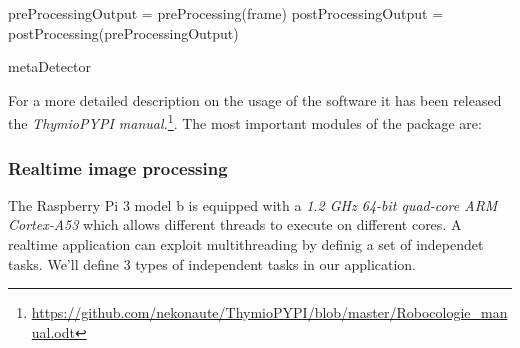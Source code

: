 \documentclass[a4paper]{report}
\begin{document}
\begin{algorithm}[H]
 preProcessingOutput = preProcessing(frame)\;
 postProcessingOutput = postProcessing(preProcessingOutput)\;
 \caption{metaDetector}
 \label{alg:meta}
\end{algorithm}

For a more detailed description on the usage of the software it has been released the \textit{ThymioPYPI manual.}\footnote{\url{https://github.com/nekonaute/ThymioPYPI/blob/master/Robocologie_manual.odt}}. The most important modules of the package are:\newline


\newpage 

\subsubsection{Realtime image processing}

The Raspberry Pi 3 model b is equipped with a \textit{1.2 GHz 64-bit quad-core ARM Cortex-A53} which allows different threads to execute on different cores.
A realtime application can exploit multithreading by definig a set of independet tasks. We'll define 3 types of independent tasks in our application.
\end{document}
